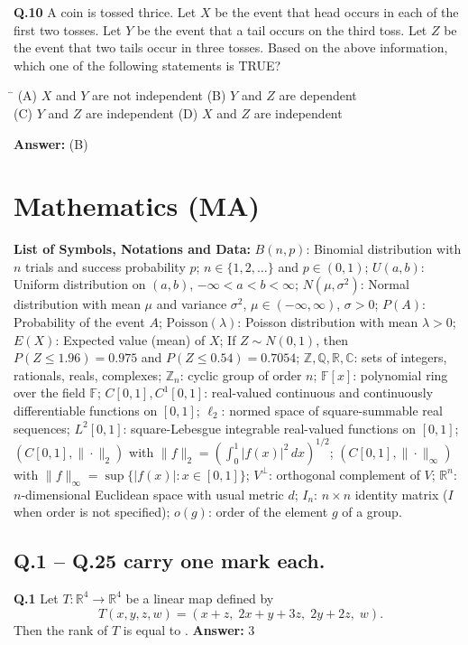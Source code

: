\documentclass[11pt,a4paper]{article}
\newcommand{\optsfourA}[4]{%
  \begin{tabbing}
    \hspace{0.48\linewidth}\=\kill
    (A) #1 \> (B) #2 \\[2pt]
    (C) #3 \> (D) #4
  \end{tabbing}%
}
\newcommand{\ans}[1]{\textbf{Answer:} #1\par\medskip}
\begin{document}
\textbf{Q.10} A coin is tossed thrice. Let $X$ be the event that head occurs in each of the first two tosses. Let $Y$ be the event that a tail occurs on the third toss. Let $Z$ be the event that two tails occur in three tosses. Based on the above information, which one of the following statements is TRUE?
\optsfourA{$X$ and $Y$ are not independent}{$Y$ and $Z$ are dependent}{$Y$ and $Z$ are independent}{$X$ and $Z$ are independent}
\ans{(B)}

\section*{Mathematics (MA)}

\textbf{List of Symbols, Notations and Data:}
$B(n,p)$: Binomial distribution with $n$ trials and success probability $p$; $n \in \{1,2,\dots\}$ and $p \in (0,1)$; $U(a,b)$: Uniform distribution on $(a,b)$, $-\infty < a < b < \infty$; $N(\mu,\sigma^2)$: Normal distribution with mean $\mu$ and variance $\sigma^2$, $\mu \in (-\infty,\infty)$, $\sigma > 0$; $P(A)$: Probability of the event $A$; $\text{Poisson}(\lambda)$: Poisson distribution with mean $\lambda > 0$; $E(X)$: Expected value (mean) of $X$; If $Z \sim N(0,1)$, then $P(Z \le 1.96) = 0.975$ and $P(Z \le 0.54) = 0.7054$; $\mathbb{Z}, \mathbb{Q}, \mathbb{R}, \mathbb{C}$: sets of integers, rationals, reals, complexes; $\mathbb{Z}_n$: cyclic group of order $n$; $\mathbb{F}[x]$: polynomial ring over the field $\mathbb{F}$; $C[0,1], C^1[0,1]$: real-valued continuous and continuously differentiable functions on $[0,1]$; $\ell_2$: normed space of square-summable real sequences; $L^2[0,1]$: square-Lebesgue integrable real-valued functions on $[0,1]$; $(C[0,1], \|\cdot\|_2)$ with $\|f\|_2 = (\int_0^1 |f(x)|^2\,dx)^{1/2}$; $(C[0,1], \|\cdot\|_\infty)$ with $\|f\|_\infty = \sup\{|f(x)| : x \in [0,1]\}$; $V^\perp$: orthogonal complement of $V$; $\mathbb{R}^n$: $n$-dimensional Euclidean space with usual metric $d$; $I_n$: $n \times n$ identity matrix ($I$ when order is not specified); $o(g)$: order of the element $g$ of a group.

\subsection*{Q.1 -- Q.25 carry one mark each.}

\textbf{Q.1} Let $T : \mathbb{R}^4 \to \mathbb{R}^4$ be a linear map defined by
\[
  T(x, y, z, w) = (x + z,\; 2x + y + 3z,\; 2y + 2z,\; w).
\]
Then the rank of $T$ is equal to \underline{\hspace{2cm}}.
\ans{$3$}
\end{document}
